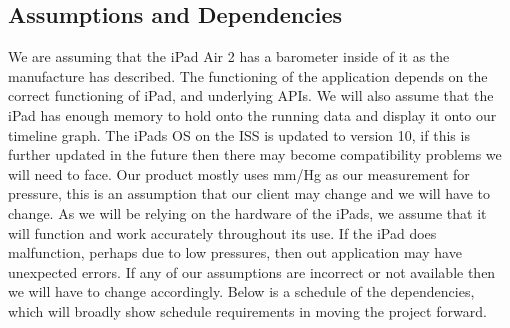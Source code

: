 \documentclass[onecolumn, draftclsnofoot,10pt, compsoc]{IEEEtran}
\begin{document}
\subsection{Assumptions and Dependencies}
We are assuming that the iPad Air 2 has a barometer inside of it as the manufacture has described.
The functioning of the application depends on the correct functioning of iPad, and underlying APIs.
We will also assume that the iPad has enough memory to hold onto the running data and display it onto our timeline graph.
The iPads OS on the ISS is updated to version 10, if this is further updated in the future then there may become compatibility problems we will need to face.
Our product mostly uses mm/Hg as our measurement for pressure, this is an assumption that our client may change and we will have to change.
As we will be relying on the hardware of the iPads, we assume that it will function and work accurately throughout its use.
If the iPad does malfunction, perhaps due to low pressures, then out application may have unexpected errors.
If any of our assumptions are incorrect or not available then we will have to change accordingly.
Below is a schedule of the dependencies, which will broadly show schedule requirements in moving the project forward.
\end{document}

